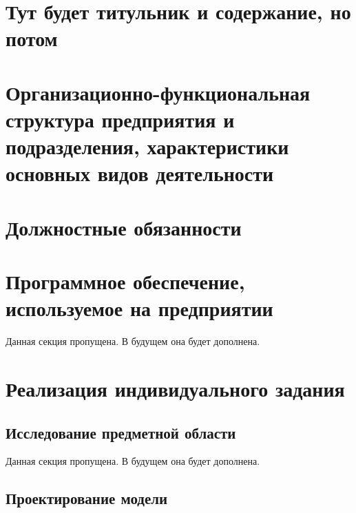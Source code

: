 \documentclass[12pt,a4paper]{article}
\author{Владислав Черняков}
\begin{document}
\section*{Тут будет титульник и содержание, но потом}

\newpage
\section{Организационно-функциональная структура предприятия и подразделения, характеристики основных видов деятельности}

\newpage
\section{Должностные обязанности}


\newpage
\section{Программное обеспечение, используемое на предприятии}

Данная секция пропущена.
В будущем она будет дополнена.

\newpage
\section{Реализация индивидуального задания}



\subsection{Исследование предметной области}

Данная секция пропущена.
В будущем она будет дополнена.

\subsection{Проектирование модели}
\end{document}
